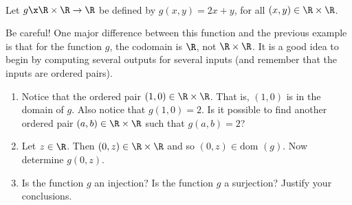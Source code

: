 \begin{prog} 
\label{pr:function2variables} \hfill \\
Let $g \x \R \times \R \to \R$ be defined by $g(x, y) = 2x + y$, for all $(x, y) \in \R \times \R$.  

\noindent
\note Be careful! One major difference between this function and the previous example is that for the function $g$, the codomain is $\R$, not $\R \times \R$.  It is a good idea to begin by computing several outputs for several inputs (and remember that the inputs are ordered pairs).

\begin{enumerate}
  \item Notice that the ordered pair $(1, 0) \in \R \times \R$.  That is, $(1, 0)$ is in the domain of $g$.  Also notice that $g(1, 0) = 2$.  Is it possible to find another ordered pair $(a, b) \in \R \times \R$ such that $g(a, b) = 2$?  %

  \item Let $z \in \R$.  Then $(0, z) \in \R \times \R$ and so $(0, z) \in \text{dom } (g)$.  Now determine $g(0, z)$.

  \item Is the function $g$ an injection?  Is the function $g$ a surjection?  Justify your conclusions.
\end{enumerate}
 
\end{prog}
\hbreak
\endinput
